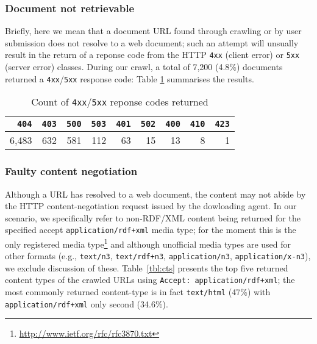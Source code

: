 \documentclass{llncs}
\begin{document}
\subsubsection{Document not retrievable}
Briefly, here we mean that a document URL found through crawling or by user submission does not resolve to a web document; such an attempt will unsually result in the return of a reponse code from the HTTP {\tt\small 4xx} (client error) or {\tt\small 5xx} (server error) classes.
During our crawl, a total of 7,200 (4.8\%) documents returned a {\tt\small 4xx}/{\tt\small 5xx} response code: Table \ref{tbl:45rc} summarises the results.

\begin{table}
 \begin{footnotesize}
  \begin{center}
    \begin{tabular}{r|r|r|r|r|r|r|r|r}
    {\tt\small 404} & {\tt\small 403} & {\tt\small 500} & {\tt\small 503} & {\tt\small 401} & {\tt\small 502} & {\tt\small 400} & {\tt\small 410} & {\tt\small 423} \\\hline
       6,483 & 632 & 581 & 112 & 63 & 15 & 13 & 8 & 1\\    
    \end{tabular}
    \caption{ \label{tbl:45rc}Count of {\tt\small 4xx}/{\tt\small 5xx} reponse codes returned}
  \end{center}
 \end{footnotesize}
\end{table}

\subsubsection{Faulty content negotiation}
Although a URL has resolved to a web document, the content may not abide by the HTTP content-negotiation request issued by the dowloading agent. In our scenario, we specifically refer to non-RDF/XML content being returned for the specified accept {\tt application/rdf+xml} media type; for the moment this is the only registered media type\footnote{\url{http://www.ietf.org/rfc/rfc3870.txt}} and although unofficial media types are used for other formats (e.g., {\tt text/n3}, {\tt text/rdf+n3}, {\tt application/n3}, {\tt application/x-n3}), we exclude discussion of these.
Table~\ref{tbl:cts} presents the top five returned content types of the crawled URLs using {\small\tt Accept: application/rdf+xml}; the most commonly returned content-type is in fact {\tt\small text/html} (47\%) with {\tt\small application/rdf+xml} only second (34.6\%).
\end{document}
